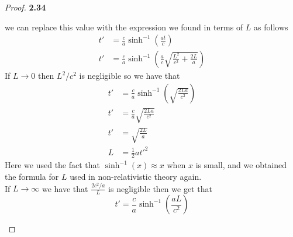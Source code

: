 \documentclass[11pt]{article}
\theoremstyle{definition}
\begin{document}
\begin{proof}{\textbf{2.34}}
\begin{itemize}
            we can replace this value with the expression we found in terms of $L$
            as follows
            \begin{align*}
                t' &= \frac{c}{a}\sinh^{-1}\left(\frac{at}{c}\right)\\
                t' &= \frac{c}{a}\sinh^{-1}\left(\frac{a}{c}\sqrt{\frac{L^2}{c^2} + \frac{2L}{a}}\right)
            \end{align*}
            If $L \to 0$ then $L^2/c^2$ is negligible so we have that
            \begin{align*}
                t' &= \frac{c}{a}\sinh^{-1}\left(\sqrt{\frac{2La}{c^2}}\right)\\
                t' &= \frac{c}{a}\sqrt{\frac{2La}{c^2}}\\
                t' &= \sqrt{\frac{2L}{a}}\\
                L &= \frac{1}{2}a{t'}^{2}
            \end{align*}
            Here we used the fact that $\sinh^{-1}(x) \approx x$ when $x$ is small, and
            we obtained the formula for $L$ used in non-relativistic theory again.\\
            If $L \to \infty$ we have that $\frac{2c^2/a}{L}$ is negligible then we get
            that
            $$t' = \frac{c}{a}\sinh^{-1}\left(\frac{aL}{c^2}\right)$$
        \end{itemize}
    \end{proof}
\end{document}

